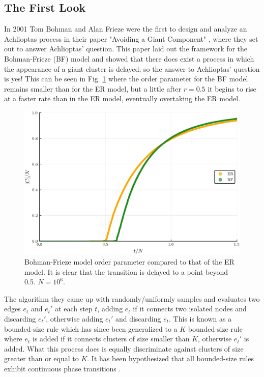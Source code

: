 \subsection{The First Look}
In 2001 Tom Bohman and Alan Frieze were the first to design and analyze an Achlioptas process in their paper "Avoiding a Giant Component" \cite{BF}, where they set out to answer Achlioptas' question.
This paper laid out the framework for the Bohman-Frieze (BF) model and showed that there does exist a process in which the appearance of a giant cluster is delayed; so the answer to Achlioptas' question is yes!
This can be seen in Fig. \ref{fig:ER_BF_transition} where the order parameter for the BF model remains smaller than for the ER model, but a little after $r = 0.5$ it begins to rise at a faster rate than in the ER model, eventually overtaking the ER model.

\begin{figure}
	\centering
	\includegraphics[width=350pt]{images/Network_ER_BF_1e6_order_param.png}
	\caption{Bohman-Frieze model order parameter compared to that of the ER model. It is clear that the transition is delayed to a point beyond 0.5. $N = 10^6$.}
	\label{fig:ER_BF_transition}
\end{figure}

The algorithm they came up with randomly/uniformly samples and evaluates two edges $e_t$ and $e_t'$ at each step $t$, adding $e_t$ if it connects two isolated nodes and discarding $e_t'$, otherwise adding $e_t'$ and discarding $e_t$.
This is known as a bounded-size rule which has since been generalized to a $K$ bounded-size rule where $e_t$ is added if it connects clusters of size smaller than $K$, otherwise $e_t'$ is added.
What this process does is equally discriminate against clusters of size greater than or equal to $K$.
It has been hypothesized that all bounded-size rules exhibit continuous phase transitions \cite{Spencer_Wormald}.

